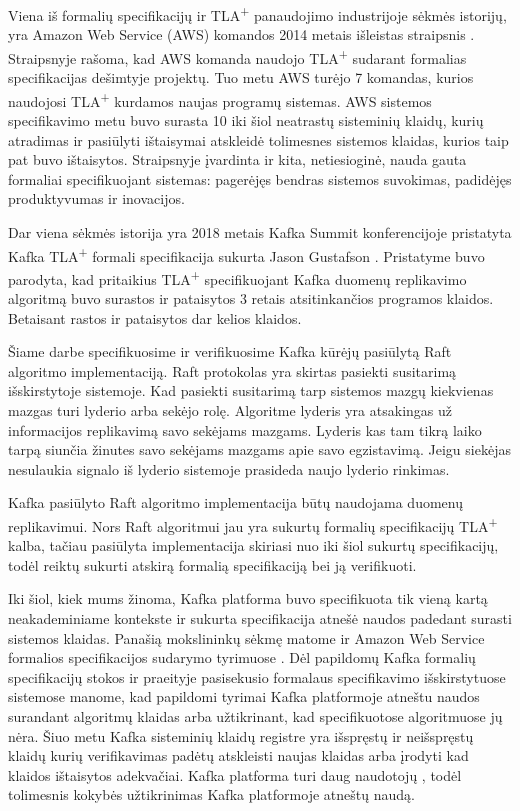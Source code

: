\documentclass{VUMIFPSmagistrinis}
\begin{document}
		Viena iš formalių specifikacijų ir TLA\textsuperscript{+} panaudojimo industrijoje sėkmės istorijų, yra Amazon Web Service (AWS) komandos 2014 metais išleistas straipsnis \cite{newcombe2014use}.
		Straipsnyje rašoma,  kad AWS komanda naudojo TLA\textsuperscript{+} sudarant formalias specifikacijas dešimtyje projektų. Tuo metu AWS turėjo 7 komandas, kurios naudojosi TLA\textsuperscript{+} kurdamos naujas programų sistemas.
		AWS sistemos specifikavimo metu buvo surasta 10 iki šiol neatrastų sisteminių klaidų, kurių atradimas ir pasiūlyti ištaisymai atskleidė tolimesnes sistemos klaidas, kurios taip pat buvo ištaisytos.
		Straipsnyje įvardinta ir kita, netiesioginė, nauda gauta formaliai specifikuojant sistemas: pagerėjęs bendras sistemos suvokimas, padidėjęs produktyvumas ir inovacijos.
		

		Dar viena sėkmės istorija yra 2018 metais Kafka Summit konferencijoje pristatyta Kafka TLA\textsuperscript{+} formali specifikacija sukurta Jason Gustafson \cite{kfkTla}.
		Pristatyme buvo parodyta, kad pritaikius TLA\textsuperscript{+} specifikuojant Kafka duomenų replikavimo algoritmą buvo surastos ir pataisytos 3 retais atsitinkančios programos klaidos.
		Betaisant rastos ir pataisytos dar kelios klaidos.


		Šiame darbe specifikuosime ir verifikuosime Kafka kūrėjų pasiūlytą Raft algoritmo implementaciją.
		Raft protokolas yra skirtas pasiekti susitarimą išskirstytoje sistemoje.
		Kad pasiekti susitarimą tarp sistemos mazgų kiekvienas mazgas turi lyderio arba sekėjo rolę.
		Algoritme lyderis yra atsakingas už informacijos replikavimą savo sekėjams mazgams.
		Lyderis kas tam tikrą laiko tarpą siunčia žinutes savo sekėjams mazgams apie savo egzistavimą.
		Jeigu siekėjas nesulaukia signalo iš lyderio sistemoje prasideda naujo lyderio rinkimas.
		
		
		Kafka pasiūlyto Raft algoritmo implementacija būtų naudojama duomenų replikavimui.
		Nors Raft algoritmui jau yra sukurtų formalių specifikacijų TLA\textsuperscript{+} kalba, tačiau pasiūlyta implementacija skiriasi nuo iki šiol sukurtų specifikacijų, todėl reiktų sukurti atskirą formalią specifikaciją bei ją verifikuoti.


		Iki šiol, kiek mums žinoma, Kafka platforma buvo specifikuota tik vieną kartą \cite{kfkTla} neakademiniame kontekste ir sukurta specifikacija atnešė naudos padedant surasti sistemos klaidas.
		Panašią mokslininkų sėkmę matome ir Amazon Web Service formalios specifikacijos sudarymo tyrimuose \cite{newcombe2014use}.
		Dėl papildomų Kafka formalių specifikacijų stokos ir praeityje pasisekusio formalaus specifikavimo išskirstytuose sistemose manome, kad papildomi tyrimai Kafka platformoje atneštu naudos surandant algoritmų klaidas arba užtikrinant, kad specifikuotose algoritmuose jų nėra.
		Šiuo metu Kafka sisteminių klaidų registre \cite{kfkissue} yra išspręstų ir neišspręstų  klaidų kurių verifikavimas padėtų atskleisti naujas klaidas arba įrodyti kad klaidos ištaisytos adekvačiai.
		Kafka platforma turi daug naudotojų \cite{kfk}, todėl tolimesnis kokybės užtikrinimas Kafka platformoje atneštų naudą.
\end{document}
